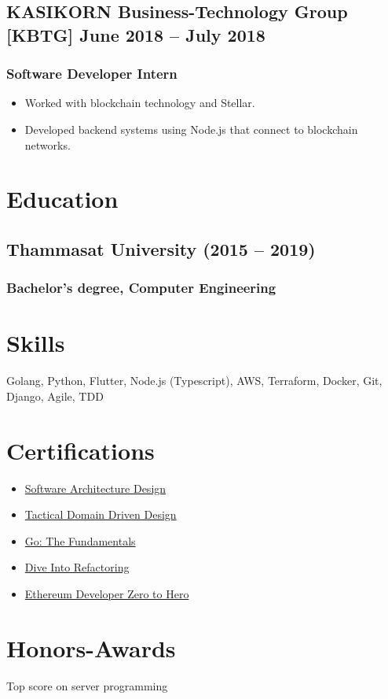 \documentclass[a4paper,10pt]{article}
\begin{document}
\subsection*{KASIKORN Business-Technology Group [KBTG] \hfill June 2018 – July 2018}
\subsubsection*{Software Developer Intern}
\begin{itemize}[leftmargin=1.5em]
    \item Worked with blockchain technology and Stellar.
    \item Developed backend systems using Node.js that connect to blockchain networks.
\end{itemize}

\section*{Education}

\subsection*{Thammasat University \hfill (2015 – 2019)}
\subsubsection*{Bachelor's degree, Computer Engineering}

\section*{Skills}
Golang, Python, Flutter, Node.js (Typescript), AWS, Terraform, Docker, Git, Django, Agile, TDD

\section*{Certifications}
\begin{itemize}[leftmargin=1.5em]
    \item \href{https://www.skooldio.com/certificate/2876a405-cb34-41de-9284-f8fe3ac85786}{Software Architecture Design}
    \item \href{https://www.skooldio.com/certificate/a80cacde-61aa-4d34-8c49-3394668b3a30}{Tactical Domain Driven Design}
    \item \href{https://www.skooldio.com/certificate/7b01976d-6aef-4985-8392-2954ab70928c}{Go: The Fundamentals}
    \item \href{https://refactoring.guru/cert/r/MTM5Njkx}{Dive Into Refactoring}
    \item \href{https://certificate.skilllane.com/certificates/E9YB924}{Ethereum Developer Zero to Hero}
\end{itemize}

\section*{Honors-Awards}
Top score on server programming
\end{document}
